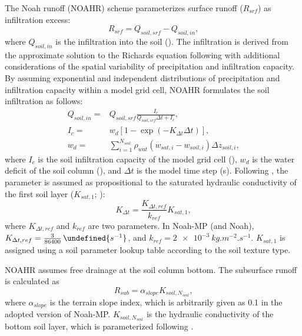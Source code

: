 \documentclass[essd, manuscript]{copernicus}
\let\unit\undefined
\begin{document}
The Noah runoff (NOAHR) scheme parameterizes surface runoff (\(R_{srf}\)) as infiltration excess:
\begin{equation}
  R_{srf} = Q_{soil,srf} - Q_{soil,in}
  \text{,}
\end{equation}
where \(Q_{soil,in}\) is the infiltration into the soil (\unit{kg.m^{-2}.s^{-1}}). The infiltration is derived from the approximate solution to the Richards equation following \citet{philip1969AiH} with additional considerations of the spatial variability of precipitation and infiltration capacity. By assuming exponential and independent distributions of precipitation and infiltration capacity within a model grid cell, NOAHR formulates the soil infiltration as follows:
\begin{align}
  Q_{soil,in} = & Q_{soil,srf} \frac{I_c}{Q_{soil,srf} \Delta t + I_c}
  \text{,} \\
  I_{c} =       & w_d [1-\exp(-K_{\Delta t} \Delta t)]
  \text{,} \\
  w_d =         & \sum_{i=1}^{N_{soil}} \rho_{wat} (w_{sat,i} - w_{soil,i}) \Delta z_{soil,i}
  \text{,}
\end{align}
where \(I_{c}\) is the soil infiltration capacity of the model grid cell (\unit{kg.m^{-2}}), \(w_d\) is the water deficit of the soil column (\unit{kg.m^{-2}}), and \(\Delta t\) is the model time step (s). Following \citet{chen2001MWR}, the parameter is assumed as propositional to the saturated hydraulic conductivity of the first soil layer (\(K_{sat,1}\); \unit{kg.m^{-2}.s^{-1}}):
\begin{equation}
  K_{\Delta t} = \frac{K_{\Delta t,ref}}{k_{ref}} K_{sat,1}
  \text{,}
\end{equation}
where \(K_{\Delta t,ref}\) and \(k_{ref}\) are two parameters. In Noah-MP (and Noah), \(K_{\Delta t,ref} = \frac{3}{86400}\,\unit{s^{-1}}\), and \(k_{ref}=\qty{2e-3}{kg.m^{-2}.s^{-1}}\). \(K_{sat,1}\) is assigned using a soil parameter lookup table according to the soil texture type.

NOAHR assumes free drainage at the soil column bottom. The subsurface runoff is calculated as
\begin{equation}
  R_{sub} = \alpha_{slope} K_{soil,N_{soil}} \label{eq:noahr:rsub}
  \text{,}
\end{equation}
where \(\alpha_{slope}\) is the terrain slope index, which is arbitrarily given as 0.1 in the adopted version of Noah-MP\@. \(K_{soil,N_{soil}}\) is the hydraulic conductivity of the bottom soil layer, which is parameterized following \citet{clapp1978WRR}.
\end{document}
